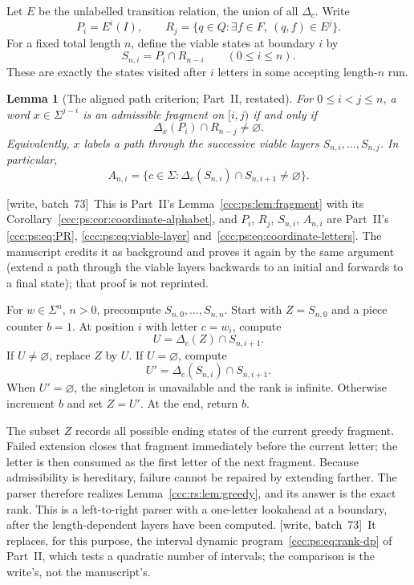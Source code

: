 \documentclass[11pt,letterpaper]{article}
\newtheorem{lemma}[theorem]{Lemma}
\theoremstyle{definition}
\theoremstyle{remark}
\newcommand{\wsevthree}{\textup{[write, batch~73]}}
\begin{document}
Let $E$ be the unlabelled transition relation, the union of all $\Delta_c$. Write
\[
P_i=E^i(I),\qquad
R_j=\{q\in Q:\exists f\in F,\ (q,f)\in E^j\}.
\]
For a fixed total length $n$, define the viable states at boundary $i$ by
\[
S_{n,i}=P_i\cap R_{n-i}\qquad(0\le i\le n).
\]
These are exactly the states visited after $i$ letters in some accepting length-$n$ run.

\begin{lemma}[The aligned path criterion; Part~II, restated]\label{ccc:rs:lem:path}
For $0\le i<j\le n$, a word $x\in\Sigma^{j-i}$ is an admissible fragment on $[i,j)$ if and only if
\[
\Delta_x(P_i)\cap R_{n-j}\ne\varnothing.
\]
Equivalently, $x$ labels a path through the successive viable layers $S_{n,i},\ldots,S_{n,j}$. In particular,
\[
A_{n,i}=\{c\in\Sigma:\Delta_c(S_{n,i})\cap S_{n,i+1}\ne\varnothing\}.
\]
\end{lemma}
\noindent\wsevthree\ This is Part~II's Lemma~\ref{ccc:ps:lem:fragment} with its
Corollary~\ref{ccc:ps:cor:coordinate-alphabet}, and $P_i$, $R_j$, $S_{n,i}$,
$A_{n,i}$ are Part~II's \eqref{ccc:ps:eq:PR}, \eqref{ccc:ps:eq:viable-layer}
and~\eqref{ccc:ps:eq:coordinate-letters}. The manuscript credits it as
background and proves it again by the same argument (extend a path through
the viable layers backwards to an initial and forwards to a final state);
that proof is not reprinted.

For $w\in\Sigma^n$, $n>0$, precompute $S_{n,0},\ldots,S_{n,n}$. Start with $Z=S_{n,0}$ and a piece counter $b=1$. At position $i$ with letter $c=w_i$, compute
\[
U=\Delta_c(Z)\cap S_{n,i+1}.
\]
If $U\ne\varnothing$, replace $Z$ by $U$. If $U=\varnothing$, compute
\[
U'=\Delta_c(S_{n,i})\cap S_{n,i+1}.
\]
When $U'=\varnothing$, the singleton is unavailable and the rank is infinite. Otherwise increment $b$ and set $Z=U'$. At the end, return $b$.

The subset $Z$ records all possible ending states of the current greedy fragment. Failed extension closes that fragment immediately before the current letter; the letter is then consumed as the first letter of the next fragment. Because admissibility is hereditary, failure cannot be repaired by extending farther. The parser therefore realizes Lemma~\ref{ccc:rs:lem:greedy}, and its answer is the exact rank. This is a left-to-right parser with a one-letter lookahead at a boundary, after the length-dependent layers have been computed.
\wsevthree\ It replaces, for this purpose, the interval dynamic
program~\eqref{ccc:ps:eq:rank-dp} of Part~II, which tests a quadratic number of
intervals; the comparison is the write's, not the manuscript's.
\end{document}
